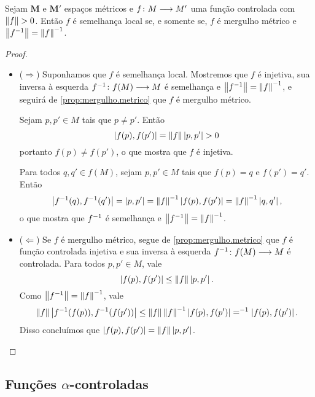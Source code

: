 \begin{proposition}
\label{prop:}
Sejam $\bm{M}$ e $\bm{M'}$ espaços métricos e ${f}\colon {M} \longrightarrow {M'}$ uma função controlada com $\left\Vert{f}\right\Vert>0$. Então $f$ é semelhança local se, e somente se, $f$ é mergulho métrico e $\left\Vert{f^{-1}}\right\Vert=\left\Vert{f}\right\Vert^{-1}$.
\end{proposition}
\begin{proof}
	\begin{itemize}
	\item ($\Rightarrow$) Suponhamos que $f$ é semelhança local. Mostremos que $f$ é injetiva, sua inversa à esquerda ${f^{-1}}\colon {f(M)} \longrightarrow {M}$ é semelhança e $\left\Vert{f^{-1}}\right\Vert=\left\Vert{f}\right\Vert^{-1}$, e seguirá de \ref{prop:mergulho.metrico} que $f$ é mergulho métrico.

	Sejam $p,p' \in M$ tais que $p \neq p'$. Então
		\begin{equation*}
		\left\vert{f(p)},{f(p')}\right\vert = \left\Vert{f}\right\Vert\left\vert{p},{p'}\right\vert > 0
		\end{equation*}
	portanto $f(p) \neq f(p')$, o que mostra que $f$ é injetiva.

	Para todos $q,q' \in f(M)$, sejam $p,p' \in M$ tais que $f(p)=q$ e $f(p')=q'$. Então
		\begin{equation*}
		\left\vert{f^{-1}(q)},{f^{-1}(q')}\right\vert = \left\vert{p},{p'}\right\vert = \left\Vert{f}\right\Vert^{-1}\left\vert{f(p)},{f(p')}\right\vert = \left\Vert{f}\right\Vert^{-1}\left\vert{q},{q'}\right\vert,
		\end{equation*}
	o que mostra que $f^{-1}$ é semelhança e $\left\Vert{f^{-1}}\right\Vert=\left\Vert{f}\right\Vert^{-1}$.

	\item ($\Leftarrow$) Se $f$ é mergulho métrico, segue de \ref{prop:mergulho.metrico} que $f$ é função controlada injetiva e sua inversa à esquerda ${f^{-1}}\colon {f(M)} \longrightarrow {M}$ é controlada. Para todos $p,p' \in M$, vale
		\begin{equation*}
		\left\vert{f(p)},{f(p')}\right\vert \leq \left\Vert{f}\right\Vert\left\vert{p},{p'}\right\vert.
		\end{equation*}
	Como $\left\Vert{f^{-1}}\right\Vert = \left\Vert{f}\right\Vert^{-1}$, vale
		\begin{equation*}
			\left\Vert{f}\right\Vert\left\vert{f^{-1}(f(p))},{f^{-1}(f(p'))}\right\vert \leq \left\Vert{f}\right\Vert\left\Vert{f}\right\Vert^{-1}\left\vert{f(p)},{f(p')}\right\vert = ^{-1}\left\vert{f(p)},{f(p')}\right\vert.
		\end{equation*}
	Disso concluímos que $\left\vert{f(p)},{f(p')}\right\vert = \left\Vert{f}\right\Vert\left\vert{p},{p'}\right\vert$.
	\qedhere
	\end{itemize}
\end{proof}




\subsection{Funções $\alpha$-controladas}

